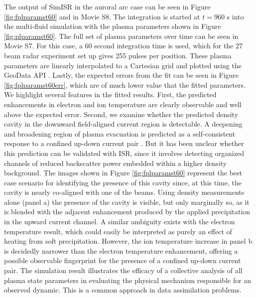 \documentclass[draft,ras]{agutex}
\begin{document}
\begin{article}
The output of SimISR in the auroral arc case can be seen in Figure \ref{fig:fplparamst60} and in Movie S8. The integration is started at $t=960$ s into the multi-fluid simulation with the plasma parameters shown in Figure \ref{fig:plparamst60}. The full set of plasma parameters over time can be seen in Movie S7. For this case, a 60 second integration time is used, which for the 27 beam radar experiment set up gives 255 pulses per position. These plasma parameters are linearly interpolated to a Cartesian grid and plotted using the GeoData API \citep{john_swoboda_2016_154533}. Lastly, the expected errors from the fit can be seen in Figure \ref{fig:fplparamst60err}, which are of much lower value that the fitted parameters.
We highlight several features in the fitted results. First, the predicted enhancements in electron and ion temperature are clearly observable and well above the expected error. Second, we examine whether the predicted density cavity in the downward field-aligned current region is  detectable. A deepening and broadening region of plasma evacuation is predicted as a self-consistent response to a confined up-down current pair \citep[e.g.,][]{cran;cavity}.  But it has been unclear whether this prediction can be validated with ISR, since it involves detecting organized channels of reduced backscatter power embedded within a higher density background.
The images shown in Figure \ref{fig:fplparamst60} represent the best case scenario for identifying the presence of this cavity since, at this time, the cavity is nearly co-aligned with one of the beams. 
Using density measurements alone (panel a) the presence of the cavity is visible, but only marginally so, as it is blended with the adjacent  enhancement produced by the applied precipitation in the upward current channel.  A similar ambiguity exists with the electron temperature result, which could easily be interpreted as purely an effect of heating from soft precipitation.   However, the ion temperature increase in panel b is decidedly narrower than the electron temperature enhancement, offering a possible observable fingerprint for the presence of a confined up-down current pair.  The simulation result illustrates the efficacy of a collective analysis of all plasma state parameters in evaluating the physical mechanism responsible for an observed dynamic.  This is a common approach in data assimilation problems.


\end{article}
\end{document}
